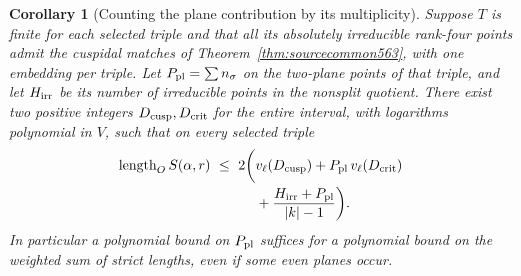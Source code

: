 \documentclass[a4paper,11pt]{article}
\newtheorem{corollary}[proposition]{Corollary}
\theoremstyle{definition}
\theoremstyle{remark}
\numberwithin{equation}{section}
\begin{document}
\begin{corollary}[Counting the plane contribution by its multiplicity]
\leavevmode\label{cor:planeweight566}
Suppose \(T\) is finite for each selected triple and that all
its absolutely irreducible rank-four points admit the cuspidal
matches of Theorem~\ref{thm:sourcecommon563}, with one
embedding per triple. Let \(P_{\rm pl}=\sum n_\sigma\) on
the two-plane points of that triple, and let \(H_{\rm irr}\)
be its number of irreducible points in the nonsplit quotient.
There exist two positive integers \(D_{\rm cusp},D_{\rm crit}\)
for the entire interval, with logarithms polynomial in \(V\),
such that on every selected triple
\[
\begin{split}
 \operatorname{length}_O S(\alpha,r)
 \ \le\ 2\bigg(&v_\ell(D_{\rm cusp})
         +P_{\rm pl}\, v_\ell(D_{\rm crit})\\[-1pt]
         &+\frac{H_{\rm irr}+P_{\rm pl}}{|k|-1}\bigg).
\end{split}
\]
In particular a polynomial bound on \(P_{\rm pl}\) suffices
for a polynomial bound on the weighted sum of strict lengths,
even if some even planes occur.
\end{corollary}
\end{document}
